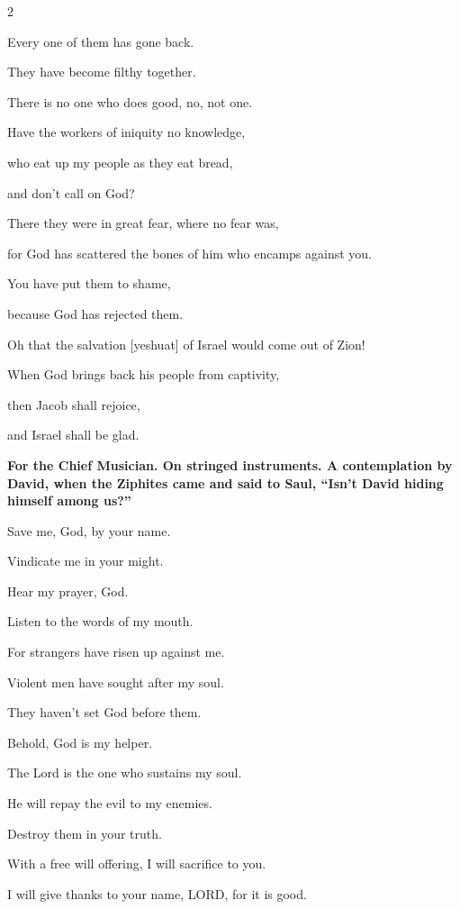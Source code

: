 \begin{multicols}{2}
	
	\myverse{}Every one of them has gone back.
	
	They have become filthy together.
	
	There is no one who does good, no, not one.
	
	
	\myverse{}Have the workers of iniquity no knowledge,
	
	who eat up my people as they eat bread,
	
	and don’t call on God?
	
	
	\myverse{}There they were in great fear, where no fear was,
	
	for God has scattered the bones of him who encamps against you.
	
	You have put them to shame,
	
	because God has rejected them.
	
	
	\myverse{}Oh that the salvation [yeshuat] of Israel would come out of Zion!
	
	When God brings back his people from captivity,
	
	then Jacob shall rejoice,
	
	and Israel shall be glad.
	
	
	\mychapter{}\textbf{For the Chief Musician. On stringed instruments. A contemplation by David, when the Ziphites
		came and said to Saul, “Isn’t David hiding himself among us?”}
	
	\myverse*{}Save me, God, by your name.
	
	Vindicate me in your might.
	
	
	\myverse{}Hear my prayer, God.
	
	Listen to the words of my mouth.
	
	
	\myverse{}For strangers have risen up against me.
	
	Violent men have sought after my soul.
	
	They haven’t set God before them.
	
	\vspace{\baselineskip}
	
	\myverse{}Behold, God is my helper.
	
	The Lord is the one who sustains my soul.
	
	
	\myverse{}He will repay the evil to my enemies.
	
	Destroy them in your truth.
	
	
	\myverse{}With a free will offering, I will sacrifice to you.
	
	I will give thanks to your name, LORD, for it is good.
	

\end{multicols}
